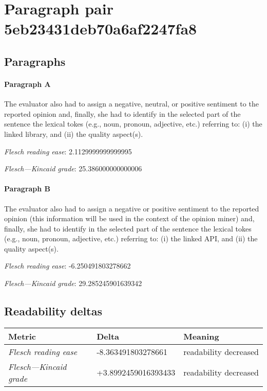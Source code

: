 \section{Paragraph pair 5eb23431deb70a6af2247fa8}
\subsection{Paragraphs}
\paragraph{Paragraph A}
The evaluator also had to assign a negative, neutral, or positive sentiment to the reported opinion and, finally, she had to identify in the selected part of the sentence the lexical tokes (e.g., noun, pronoun, adjective, etc.) referring to: (i) the linked library, and (ii) the quality aspect(s).\par\medskip\emph{Flesch reading ease}: 2.1129999999999995\par\emph{Flesch---Kincaid grade}: 25.386000000000006

\paragraph{Paragraph B}
The evaluator also had to assign a negative or positive sentiment to the reported opinion (this information will be used in the context of the opinion miner) and, finally, she had to identify in the selected part of the sentence the lexical tokes (e.g., noun, pronoun, adjective, etc.) referring to: (i) the linked API, and (ii) the quality aspect(s).\par\medskip\emph{Flesch reading ease}: -6.250491803278662\par\emph{Flesch---Kincaid grade}: 29.285245901639342

\subsection{Readability deltas}

\begin{tabular}{lll}
\toprule
               \textbf{Metric} &       \textbf{Delta} &       \textbf{Meaning} \\
\midrule
    \emph{Flesch reading ease} &   -8.363491803278661 &  readability decreased \\
 \emph{Flesch---Kincaid grade} &  +3.8992459016393433 &  readability decreased \\
\bottomrule
\end{tabular}


